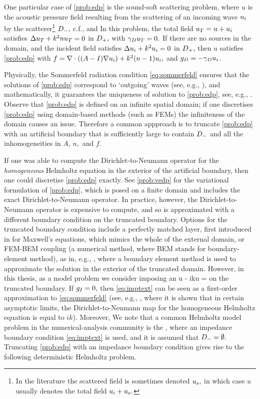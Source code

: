 One particular case of \cref{prob:edp} is the sound-soft scattering problem, where $u$ is the acoustic pressure field resulting from the scattering of an incoming wave $u_{i}$ by the scatterer\footnote{In the literature the scattered field is sometimes denoted $u_{s},$ in which case $u$ usually denotes the total field $u_{i}+ u_{s}.$} $D_{-},$ c.f., \cite[Section 1.1]{Ih:98} and \cite[Section 1.1]{CoKr:13} In this problem, the total field $u_{T} = u + u_{i}$ satisfies $\Delta u_{T} + k^2nu_{T} = 0$ in $D_{+},$ with $\gamma_{D} u_{T} = 0.$ If there are no sources in the domain, and the incident field satisfies $\Delta u_{i} + k^2 u_{i} = 0$ in $D_{+},$ then $u$ satisfies \cref{prob:edp} with $f = \grad \cdot \mleft(\mleft(A-I\mright) \grad \ui\mright) + k^2 \mleft(n-1\mright)\ui,$ and $g_{D} = - \gamma_{D} u_{i}$.

Physically, the Sommerfeld radiation condition \eqref{eq:sommerfeld} ensures that the solutions of  \ref{prob:edp} correspond to `outgoing' waves (see, e.g., \cite[Section 1.1.3]{Ih:98}), and mathematically, it guarantees the uniqueness of solution to \cref{prob:edp}, see, e.g., \cite[Corollary 2.9]{ChGrLaSp:12}. Observe that \cref{prob:edp} is defined on an infinite spatial domain; if one discretises \cref{prob:edp} using domain-based methods (such as FEMs) the infiniteness of the domain causes an issue. Therefore a common appproach is to truncate \cref{prob:edp} with an artificial boundary that is sufficiently large to contain $D_{-}$ and all the inhomogeneities in $A$, $n,$ and $f.$

If one was able to compute the Dirichlet-to-Neumann operator for the \emph{homogeneous} Helmholtz equation in the exterior of the artificial boundary, then one could discretise \cref{prob:edp} exactly. See \cref{prob:vedp} for the variational formulation of \cref{prob:edp}, which is posed on a finite domain and includes the exact Dirichlet-to-Neumann operator. In practice, however, the Dirichlet-to-Neumann operator is expensive to compute, and so is approximated with a different boundary condition on the truncated boundary. Options for the truncated boundary condition include a perfectly matched layer, first introduced in \cite{Be:94} for Maxwell's equations, which mimics the whole of the external domain, or FEM-BEM coupling (a numerical method, where BEM stands for boundary-element method), as in, e.g., \cite{HiMe:06}, where a boundary element method is used to approximate the solution in the exterior of the truncated domain. However, in this thesis, as a model problem we consider imposing an 
\beq\label{eq:imptext}
\dn u - iku = \gI
\eeq
on the truncated boundary. If $g_{I} = 0,$ then \eqref{eq:imptext} can be seen as a first-order approximation to \eqref{eq:sommerfeld} (see, e.g., \cite[p. 353]{GaMuSp:19}, where it is shown that in certain asymptotic limits, the Dirichlet-to-Neumann map for the homogeneous Helmholtz equation is equal to $ik$). Moreover, We note that a common Helmholtz model problem in the numerical-analysis community is the , where an impedance boundary condition \cref{eq:imptext} is used, and it is assumed that $D_{-} = \emptyset.$ Truncating \cref{prob:edp} with an impedance boundary condition gives rise to the following deterministic Helmholtz problem.


